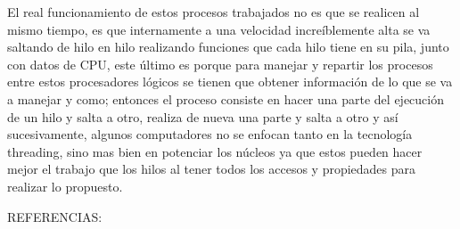 \documentclass[11pt]{letter}
\begin{document}
El real funcionamiento de estos procesos trabajados no es que se realicen al mismo tiempo, es que internamente a una velocidad increíblemente alta se va saltando de hilo en hilo realizando funciones que cada hilo tiene en su pila, junto con datos de CPU, este último es porque para manejar y repartir los procesos entre estos procesadores lógicos se tienen que obtener información de lo que se va a manejar y como; entonces el proceso consiste en hacer una parte del ejecución de un hilo y salta a otro, realiza de nueva una parte y salta a otro y así sucesivamente, algunos computadores no se enfocan tanto en la tecnología threading, sino mas bien en potenciar los núcleos ya que estos pueden hacer mejor el trabajo que los hilos al tener todos los accesos y propiedades para realizar lo propuesto.



\newpage
REFERENCIAS:\\\\
\end{document}
